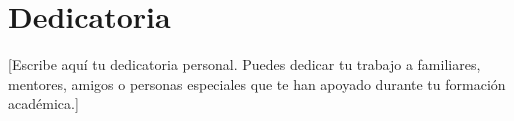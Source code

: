 \chapter*{Dedicatoria}

[Escribe aquí tu dedicatoria personal. Puedes dedicar tu trabajo a familiares, mentores, amigos o personas especiales que te han apoyado durante tu formación académica.]

\vspace{1cm}

\begin{flushright}
    [Tu nombre]
\end{flushright}